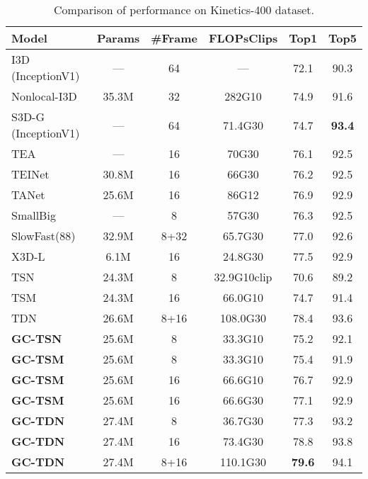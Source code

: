 \begin{table}[htbp]
		\centering
		\scriptsize
\begin{tabular}{l|c|c|c|cc}
			\hline
			Model &Params &\#Frame &FLOPsClips &Top1 &Top5 \\
            \midrule[1pt]
I3D (InceptionV1) \cite{carreira2017quo} & --- &64 &---  &72.1 &90.3 \\
            Nonlocal-I3D \cite{wang2018non} &35.3M  &32 &282G10  &74.9 &91.6 \\
            S3D-G (InceptionV1) \cite{xie2018rethinking} &--- &64 &71.4G30 &74.7 &\textbf{93.4} \\
TEA \cite{li2020tea} &--- & 16 &70G30 &76.1 &92.5 \\
            TEINet \cite{liu2020teinet} &30.8M & 16 &66G30 &76.2 &92.5 \\
            TANet \cite{liu2020tam} &25.6M &16 &86G12 &76.9 &92.9 \\
SmallBig \cite{li2020smallbignet} &--- &8 &57G30 &76.3  &92.5 \\
SlowFast(88) \cite{feichtenhofer2019slowfast} &32.9M &8+32 &65.7G30 &77.0 &92.6 \\
            X3D-L \cite{feichtenhofer2020x3d} &6.1M & 16 &24.8G30 &77.5 &92.9 \\
\hline
            TSN \cite{zhou2018temporal} &24.3M &8 &32.9G10clip  &70.6 &89.2 \\
TSM \cite{lin2019tsm} &24.3M  &16 &66.0G10 &74.7 &91.4 \\
            TDN \cite{wang2021tdn} &26.6M &8+16 &108.0G30 &78.4  &93.6 \\
\hline
\textbf{GC-TSN} &25.6M &8 &33.3G10 &75.2  &92.1 \\
            \textbf{GC-TSM} &25.6M &8 &33.3G10 &75.4  &91.9 \\
            \textbf{GC-TSM} &25.6M &16 &66.6G10 &76.7  &92.9 \\
            \textbf{GC-TSM} &25.6M &16 &66.6G30 &77.1  &92.9 \\
            \textbf{GC-TDN} &27.4M &8 &36.7G30 &77.3  &93.2 \\
            \textbf{GC-TDN} &27.4M &16 &73.4G30 &78.8  &93.8 \\
            \textbf{GC-TDN} &27.4M &8+16 &110.1G30 &\textbf{79.6}  &94.1 \\
\hline
\end{tabular}
		\caption{Comparison of performance on Kinetics-400 dataset.}
		\vspace{-0.3cm}
		\label{tab:res_kinetic}
\end{table}



